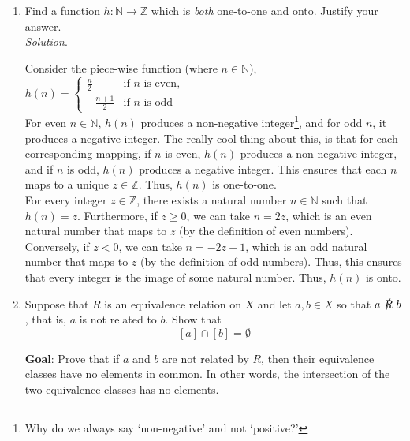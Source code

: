 \documentclass[10pt]{article}
\newenvironment{solution}{\textit{Solution}.}
\newcommand{\proofseparator}{\noindent\makebox[\linewidth]{\rule{\textwidth}{0.4pt}}}
\newcommand{\sol}[1]{
    \vspace{5pt}
    \begin{solution}
    #1
    \end{solution}
    \proofseparator
}
\newcommand{\N}{\ensuremath{\mathbb{N}}}
\newcommand{\Z}{\ensuremath{\mathbb{Z}}}
\begin{document}
\begin{enumerate}
{              It is not onto because there does not exist an $n\in N$ for which $g(n) = 1$. In other words, $1$ (in the co-domain) is never mapped to by an element in the domain.
          }

          \vspace{0.3cm}

    \item Find a function $h \colon \N \rightarrow \Z$ which is \textit{both} one-to-one and onto. Justify your answer. \\

          \sol{
              Consider the piece-wise function (where $n\in \N$),
              $h(n) =
                  \begin{cases}
                      \frac{n}{2}      & \text{if } n \text{ is even}, \\
                      -\frac{n + 1}{2} & \text{if } n \text{ is odd}
                  \end{cases} $ \\

              For even $n\in \N$, $h(n)$ produces a non-negative integer\footnote{Why do we always say `non-negative' and not `positive?'}, and for odd $n$, it produces a negative integer. The really cool thing about this, is that for each corresponding mapping, if $n$ is even, $h(n)$ produces a non-negative integer, and if $n$ is odd, $h(n)$ produces a negative integer. This ensures that each $n$ maps to a unique $z\in \Z$. Thus, $h(n)$ is one-to-one. \\

              For every integer $z\in \Z$, there exists a natural number $n\in \N$ such that $h(n) = z$. Furthermore, if $z\geq 0$, we can take $n = 2z$, which is an even natural number that maps to $z$ (by the definition of even numbers). Conversely, if $z < 0$, we can take $n = -2z - 1$, which is an odd natural number that maps to $z$ (by the definition of odd numbers). Thus, this ensures that every integer is the image of some natural number. Thus, $h(n)$ is onto.
          }

          \vspace{0.3cm}

    \item Suppose that $R$ is an equivalence relation on $X$ and let $a,b \in X$ so that $a\ \slashed{R} \ b$, that is, $a$ is not related to $b$. Show that $$[a] \cap [b] = \emptyset$$

          \textbf{Goal}: Prove that if $a$ and $b$ are not related by $R$, then their equivalence classes have no elements in common. In other words, the intersection of the two equivalence classes has no elements. \\


\end{enumerate}
\end{document}
